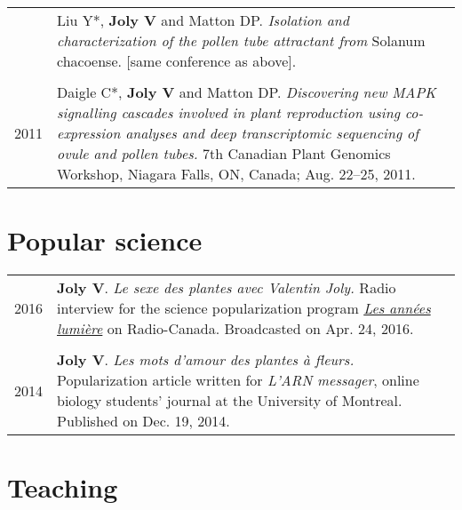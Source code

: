 \documentclass[letterpaper,12pt]{article}
\begin{document}
\begin{tabularx}{\textwidth}{@{}r|X@{}}
& Liu Y*, \textbf{Joly V} and Matton DP.
  \emph{Isolation and characterization of the pollen tube attractant from}
  Solanum chacoense. [same conference as above].
  \\

\multicolumn{2}{c}{} \\

2011
& Daigle C*, \textbf{Joly V} and Matton DP.
  \emph{Discovering new MAPK signalling cascades involved in plant reproduction
  using co-expression analyses and deep transcriptomic sequencing of ovule
  and pollen tubes.}
  7th Canadian Plant Genomics Workshop, Niagara Falls, ON, Canada;
  Aug. 22–25, 2011.
  \\

\end{tabularx}

\vspace{6mm}

\section[Popular science]{Popular science}

\begin{tabularx}{\textwidth}{@{}r|X@{}}

2016
& \textbf{Joly V}. {\em Le sexe des plantes avec Valentin Joly.} Radio
  interview for the science popularization program \href{http://ici.radio-canada.ca/emissions/les_annees_lumiere/2009-2010/chronique.asp?idChronique=404672}{\emph{Les années lumière}}
  on Radio-Canada. Broadcasted on Apr. 24, 2016. \\

\multicolumn{2}{c}{} \\

2014
& \textbf{Joly V}. {\em Les mots d’amour des plantes à fleurs.} Popularization
  article written for \emph{L'ARN messager}, online biology students' journal at
  the University of Montreal. Published on Dec. 19, 2014.
  \\

\end{tabularx}


\newpage

\section{Teaching}
\end{document}
